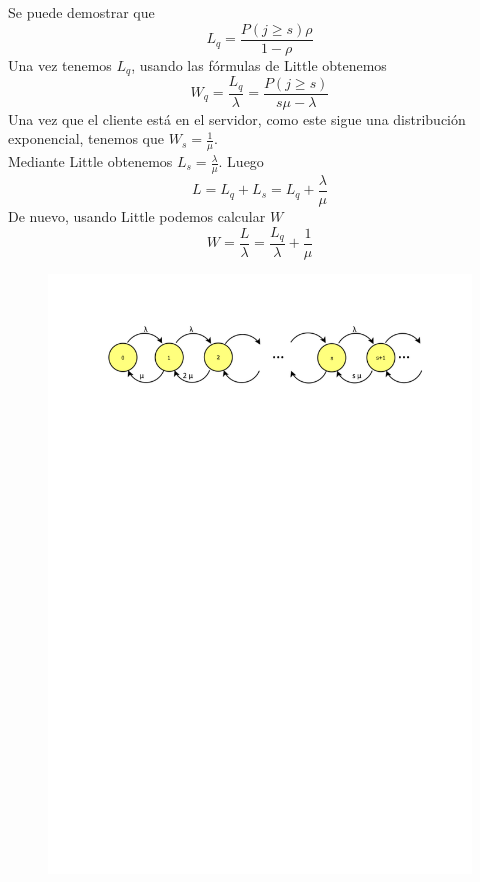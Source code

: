 		Se puede demostrar que 
		$$L_q=\frac{P(j\geq s)\rho}{1-\rho}$$
		Una vez tenemos $L_q$, usando las f\'ormulas de Little obtenemos
		$$W_q=\frac{L_q}{\lambda}=\frac{P(j\geq s)}{s\mu-\lambda}$$
		\hspace{0.5cm} Una vez que el cliente est\'a en el servidor, como este sigue una distribuci\'on exponencial, tenemos que $W_s=\frac{1}{\mu}$.\\
	    \hspace{0.5cm}	Mediante Little obtenemos $L_s=\frac{\lambda}{\mu}$. Luego
		$$L=L_q+L_s=L_q+\frac{\lambda}{\mu}$$
		De nuevo, usando Little podemos calcular $W$
		$$W=\frac{L}{\lambda}=\frac{L_q}{\lambda}+\frac{1}{\mu}$$
		
		\begin{figure}[h]
			\centering\includegraphics[trim = 10mm 220mm 10mm 25mm, clip,width=0.9\linewidth]{MMs}
		\end{figure}
		
		
		
	